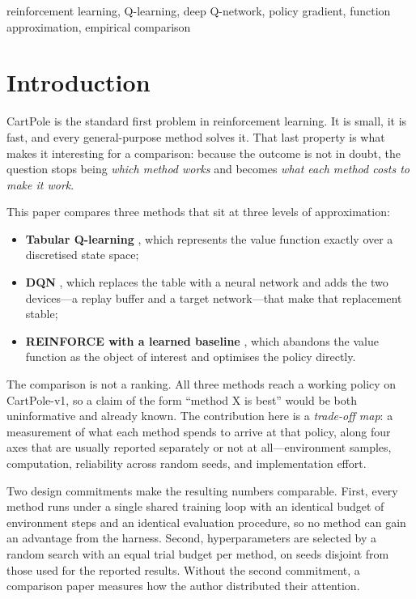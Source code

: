\documentclass[conference]{IEEEtran}
\begin{document}
\begin{IEEEkeywords}
reinforcement learning, Q-learning, deep Q-network, policy gradient,
function approximation, empirical comparison
\end{IEEEkeywords}

\section{Introduction}

CartPole \cite{barto1983} is the standard first problem in reinforcement
learning. It is small, it is fast, and every general-purpose method solves it.
That last property is what makes it interesting for a comparison: because the
outcome is not in doubt, the question stops being \emph{which method works} and
becomes \emph{what each method costs to make it work}.

This paper compares three methods that sit at three levels of approximation:

\begin{itemize}
\item \textbf{Tabular Q-learning} \cite{watkins1992}, which represents the value
      function exactly over a discretised state space;
\item \textbf{DQN} \cite{mnih2015}, which replaces the table with a neural
      network and adds the two devices---a replay buffer and a target
      network---that make that replacement stable;
\item \textbf{REINFORCE with a learned baseline} \cite{williams1992}, which
      abandons the value function as the object of interest and optimises the
      policy directly.
\end{itemize}

The comparison is not a ranking. All three methods reach a working policy on
CartPole-v1, so a claim of the form ``method X is best'' would be both
uninformative and already known. The contribution here is a \emph{trade-off map}:
a measurement of what each method spends to arrive at that policy, along four
axes that are usually reported separately or not at all---environment samples,
computation, reliability across random seeds, and implementation effort.

Two design commitments make the resulting numbers comparable. First, every method
runs under a single shared training loop with an identical budget of
\StepBudget{} environment steps and an identical evaluation procedure, so no
method can gain an advantage from the harness. Second, hyperparameters are
selected by a random search with an equal trial budget per method, on seeds
disjoint from those used for the reported results. Without the second commitment,
a comparison paper measures how the author distributed their attention.
\end{document}
